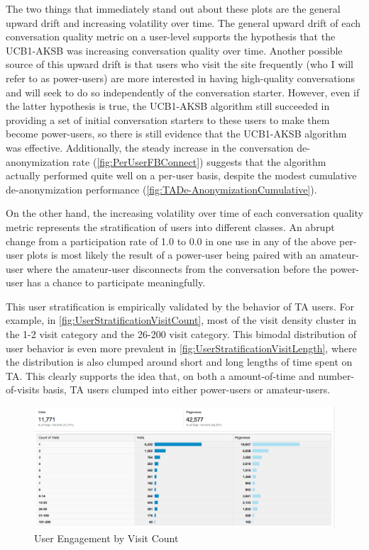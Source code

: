 The two things that immediately stand out about these plots are the general upward drift and increasing volatility over time. The general upward drift of each conversation quality metric on a user-level supports the hypothesis that the UCB1-AKSB was increasing conversation quality over time. Another possible source of this upward drift is that users who visit the site frequently (who I will refer to as power-users) are more interested in having high-quality conversations and will seek to do so independently of the conversation starter. However, even if the latter hypothesis is true, the UCB1-AKSB algorithm still succeeded in providing a set of initial conversation starters to these users to make them become power-users, so there is still evidence that the UCB1-AKSB algorithm was effective. Additionally, the steady increase in the conversation de-anonymization rate (\autoref{fig:PerUserFBConnect}) suggests that the algorithm actually performed quite well on a per-user basis, despite the modest cumulative de-anonymization performance (\autoref{fig:TADe-AnonymizationCumulative}).

On the other hand, the increasing volatility over time of each conversation quality metric represents the stratification of users into different classes. An abrupt change from a participation rate of 1.0 to 0.0 in one use in any of the above per-user plots is most likely the result of a power-user being paired with an amateur-user where the amateur-user disconnects from the conversation before the power-user has a chance to participate meaningfully.

This user stratification is empirically validated by the behavior of TA users. For example, in \autoref{fig:UserStratificationVisitCount}, most of the visit density cluster in the 1-2 visit category and the 26-200 visit category. This bimodal distribution of user behavior is even more prevalent in \autoref{fig:UserStratificationVisitLength}, where the distribution is also clumped around short and long lengths of time spent on TA. This clearly supports the idea that, on both a amount-of-time and number-of-visits basis, TA users clumped into either power-users or amateur-users.

\begin{figure}[H]
\centering
\includegraphics[trim= 0mm 0mm 0mm 0mm, clip, scale=0.3]{./Figures/UserStratificationVisitCount}
\caption{User Engagement by Visit Count}
\label{fig:UserStratificationVisitCount}
\end{figure}

